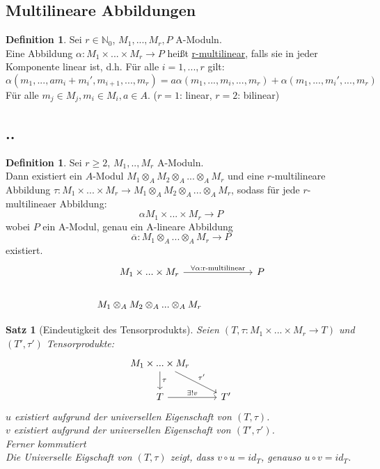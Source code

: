 \documentclass[10pt,a4paper]{article}
\newcommand{\N}{\ensuremath{\mathbb{N}}}
\newcommand{\al}{\ensuremath{\alpha}}
\newcommand{\ol}[1]{\overline{#1}}
\newcounter{thm}[section]
\theoremstyle{definition}
\newtheorem{definition}[thm]{Definition}
\theoremstyle{plain}
\newtheorem{satz}[thm]{Satz}
\theoremstyle{remark}
\begin{document}
\subsection{Multilineare Abbildungen}
\begin{definition}
	Sei $r\in \N_0$, $M_1,...,M_r,P$ A-Moduln.\\
	Eine Abbildung $\al:M_1\times...\times M_r\rightarrow P$ heißt \underline{r-multilinear}, falls sie in jeder Komponente linear ist, d.h. Für alle $i=1,...,r$ gilt:
	\[\al(m_1,...,am_{i}+m_i',m_{i+1},...,m_r)=a\al(m_1,...,m_i,...,m_r)+\al(m_1,...,m_i',...,m_r)\]
	Für alle $m_j\in M_j,m_i\in M_i,a\in A$.
	($r=1$: linear, $r=2$: bilinear)
\end{definition}
\subsection{..}
\begin{definition}
	Sei $r\ge 2$, $M_1,..,M_r$ A-Moduln.\\
	Dann existiert ein $A$-Modul $M_1\otimes_AM_2\otimes_A...\otimes_AM_r$ und eine $r$-multilineare Abbildung $\tau:M_1\times...\times M_r\rightarrow M_1\otimes_AM_2\otimes_A...\otimes_AM_r$, sodass für jede $r$-multilineaer Abbildung:
	\[\al M_1\times...\times M_r\rightarrow P\]
	wobei $P$ ein A-Modul, genau ein A-lineare Abbildung 
	\[\ol\al:M_1\otimes_A...\otimes_AM_r\rightarrow P\]
	existiert.
	\[
	\begin{tikzcd}
		M_1\times...\times M_r \arrow{rr}{\forall\al:\text{r-multilinear}} && P\\
		M_1\otimes_AM_2\otimes_A...\otimes_A M_r &
	\end{tikzcd}
	\]
	
\end{definition}
\begin{satz}[Eindeutigkeit des Tensorprodukts]
	Seien $(T,\tau:M_1\times...\times M_r\rightarrow T)$ und $(T',\tau')$ Tensorprodukte:
	\[\begin{tikzcd}
		M_1\times...\times M_r \ar{d}{\tau} \ar{dr}{\tau'}&\\
		T\ar{r}{\exists!v}&T'
	\end{tikzcd}\]
	$u$ existiert aufgrund der universellen Eigenschaft von $(T,\tau)$.\\
	$v$ existiert aufgrund der universellen Eigenschaft von $(T',\tau')$.\\
	Ferner kommutiert\\
	
	Die Universelle Eigschaft von $(T,\tau)$ zeigt, dass $v\circ u=id_T$, genauso $u\circ v=id_T$.
\end{satz}
\end{document}
